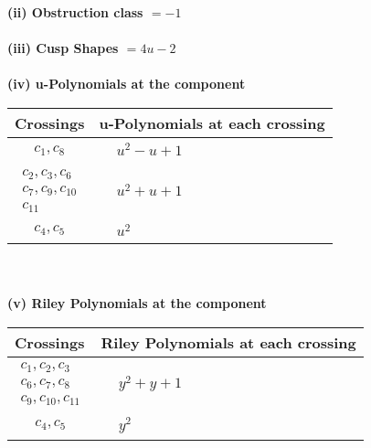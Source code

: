\documentclass[1p]{elsarticle_modified}
\theoremstyle{definition}
\begin{document}
\flushleft \textbf{(ii) Obstruction class $= -1$}\\~\\
\flushleft \textbf{(iii) Cusp Shapes $= 4 u-2$}\\~\\
\newpage\renewcommand{\arraystretch}{1}
\flushleft \textbf{(iv) u-Polynomials at the component}\newline \\
\begin{tabular}{m{50pt}|m{274pt}}
Crossings & \hspace{64pt}u-Polynomials at each crossing \\
\hline $$\begin{aligned}c_{1},c_{8}\end{aligned}$$&$\begin{aligned}
&u^2- u+1
\end{aligned}$\\
\hline $$\begin{aligned}c_{2},c_{3},c_{6}\\c_{7},c_{9},c_{10}\\c_{11}\end{aligned}$$&$\begin{aligned}
&u^2+u+1
\end{aligned}$\\
\hline $$\begin{aligned}c_{4},c_{5}\end{aligned}$$&$\begin{aligned}
&u^2
\end{aligned}$\\
\hline
\end{tabular}\\~\\
\newpage\renewcommand{\arraystretch}{1}
\flushleft \textbf{(v) Riley Polynomials at the component}\newline \\
\begin{tabular}{m{50pt}|m{274pt}}
Crossings & \hspace{64pt}Riley Polynomials at each crossing \\
\hline $$\begin{aligned}c_{1},c_{2},c_{3}\\c_{6},c_{7},c_{8}\\c_{9},c_{10},c_{11}\end{aligned}$$&$\begin{aligned}
&y^2+y+1
\end{aligned}$\\
\hline $$\begin{aligned}c_{4},c_{5}\end{aligned}$$&$\begin{aligned}
&y^2
\end{aligned}$\\
\hline
\end{tabular}\\~\\
\end{document}
